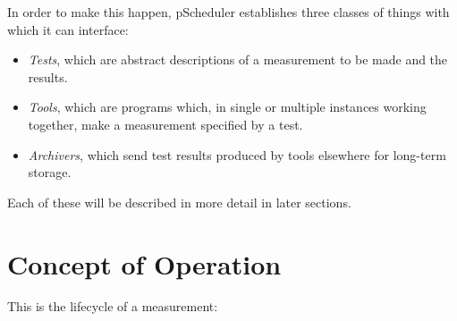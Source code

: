 \documentclass[10pt,titlepage]{article}
\begin{document}
In order to make this happen, pScheduler establishes three classes of
things with which it can interface:

\begin{itemize}
\item {\it Tests}, which are abstract descriptions of a measurement to
  be made and the results.
\item {\it Tools}, which are programs which, in single or multiple
  instances working together, make a measurement specified by a test.
\item {\it Archivers}, which send test results produced by tools
  elsewhere for long-term storage.
\end{itemize}

Each of these will be described in more detail in later sections.

\section{Concept of Operation}


This is the lifecycle of a measurement:
\end{document}
